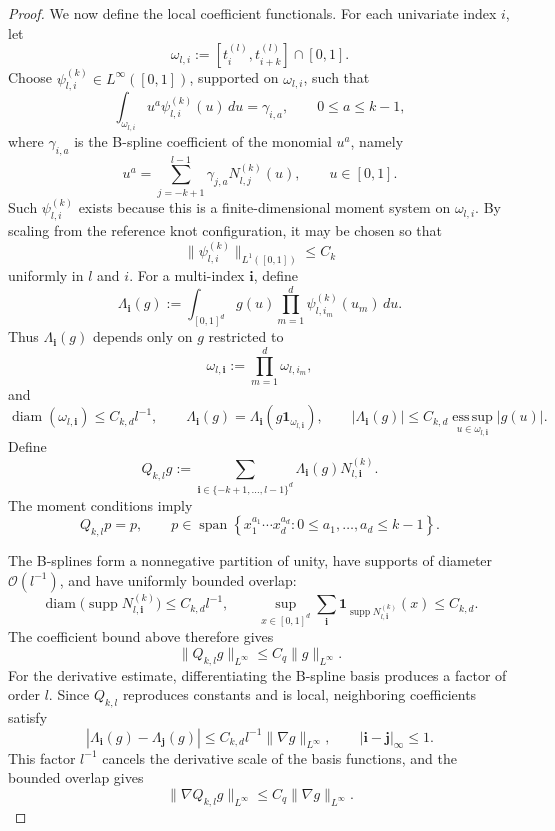 \documentclass[11pt]{article}
\theoremstyle{plain}
\theoremstyle{definition}
\theoremstyle{remark}
\begin{document}
\begin{proof}
We now define the local coefficient functionals. For each univariate index
\(i\), let
\[
\omega_{l,i}:=[t_i^{(l)},t_{i+k}^{(l)}]\cap[0,1].
\]
Choose \(\psi_{l,i}^{(k)}\in L^\infty([0,1])\), supported on
\(\omega_{l,i}\), such that
\[
\int_{\omega_{l,i}} u^a\psi_{l,i}^{(k)}(u)\,du
=
\gamma_{i,a},
\qquad
0\le a\le k-1,
\]
where \(\gamma_{i,a}\) is the B-spline coefficient of the monomial \(u^a\),
namely
\[
u^a
=
\sum_{j=-k+1}^{l-1}\gamma_{j,a}N_{l,j}^{(k)}(u),
\qquad u\in[0,1].
\]
Such \(\psi_{l,i}^{(k)}\) exists because this is a finite-dimensional moment
system on \(\omega_{l,i}\). By scaling from the reference knot
configuration, it may be chosen so that
\[
\|\psi_{l,i}^{(k)}\|_{L^1([0,1])}
\le C_k
\]
uniformly in \(l\) and \(i\). For a multi-index \(\mathbf i\), define
\[
\Lambda_{\mathbf i}(g)
:=
\int_{[0,1]^d}
g(u)
\prod_{m=1}^d\psi_{l,i_m}^{(k)}(u_m)\,du .
\]
Thus \(\Lambda_{\mathbf i}(g)\) depends only on \(g\) restricted to
\[
\omega_{l,\mathbf i}:=
\prod_{m=1}^d\omega_{l,i_m},
\]
and
\begin{equation}
\label{eq:qi-coefficient-local-stability}
\operatorname{diam}(\omega_{l,\mathbf i})\le C_{k,d}l^{-1},
\qquad
\Lambda_{\mathbf i}(g)=\Lambda_{\mathbf i}(g\mathbf 1_{\omega_{l,\mathbf i}}),
\qquad
|\Lambda_{\mathbf i}(g)|
\le
C_{k,d}\operatorname*{ess\,sup}_{u\in\omega_{l,\mathbf i}}|g(u)|.
\end{equation}
Define
\[
Q_{k,l}g
:=
\sum_{\mathbf i\in\{-k+1,\dots,l-1\}^d}
\Lambda_{\mathbf i}(g)N_{l,\mathbf i}^{(k)}.
\]
The moment conditions imply
\begin{equation}
\label{eq:qi-polynomial-reproduction}
Q_{k,l}p=p,
\qquad
p\in\operatorname{span}
\left\{
x_1^{a_1}\cdots x_d^{a_d}:0\le a_1,\dots,a_d\le k-1
\right\}.
\end{equation}

The B-splines form a nonnegative partition of unity, have supports of
diameter \(\mathcal O(l^{-1})\), and have uniformly bounded overlap:
\begin{equation}
\label{eq:bspline-local-overlap}
\operatorname{diam}\bigl(\operatorname{supp}N_{l,\mathbf i}^{(k)}\bigr)
\le C_{k,d}l^{-1},
\qquad
\sup_{x\in[0,1]^d}
\sum_{\mathbf i}
\mathbf 1_{\operatorname{supp}N_{l,\mathbf i}^{(k)}}(x)
\le C_{k,d}.
\end{equation}
The coefficient bound above therefore gives
\[
\|Q_{k,l}g\|_{L^\infty}
\le
C_q\|g\|_{L^\infty}.
\]
For the derivative estimate, differentiating the B-spline basis produces a
factor of order \(l\). Since \(Q_{k,l}\) reproduces constants and is local,
neighboring coefficients satisfy
\[
|\Lambda_{\mathbf i}(g)-\Lambda_{\mathbf j}(g)|
\le
C_{k,d}l^{-1}\|\nabla g\|_{L^\infty},
\qquad
|\mathbf i-\mathbf j|_\infty\le1.
\]
This factor \(l^{-1}\) cancels the derivative scale of the basis functions,
and the bounded overlap gives
\[
\|\nabla Q_{k,l}g\|_{L^\infty}
\le
C_q\|\nabla g\|_{L^\infty}.
\]


\end{proof}
\end{document}
